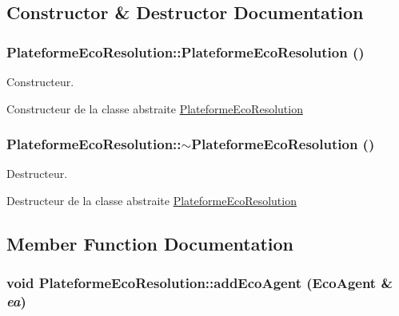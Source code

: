 \subsection{Constructor \& Destructor Documentation}
\hypertarget{classPlateformeEcoResolution_6e03cc2c6a51bc4a47d2d226e41d13e9}{
\subsubsection[{PlateformeEcoResolution}]{\setlength{\rightskip}{0pt plus 5cm}PlateformeEcoResolution::PlateformeEcoResolution ()}}
\label{classPlateformeEcoResolution_6e03cc2c6a51bc4a47d2d226e41d13e9}


Constructeur. 

Constructeur de la classe abstraite \hyperlink{classPlateformeEcoResolution}{PlateformeEcoResolution} \hypertarget{classPlateformeEcoResolution_356b4862f53c4be870304e5186601b5a}{
\subsubsection[{$\sim$PlateformeEcoResolution}]{\setlength{\rightskip}{0pt plus 5cm}PlateformeEcoResolution::$\sim$PlateformeEcoResolution ()}}
\label{classPlateformeEcoResolution_356b4862f53c4be870304e5186601b5a}


Destructeur. 

Destructeur de la classe abstraite \hyperlink{classPlateformeEcoResolution}{PlateformeEcoResolution} 

\subsection{Member Function Documentation}
\hypertarget{classPlateformeEcoResolution_6fdb4c8ecc62252da4326d9763d4f28d}{
\subsubsection[{addEcoAgent}]{\setlength{\rightskip}{0pt plus 5cm}void PlateformeEcoResolution::addEcoAgent ({\bf EcoAgent} \& {\em ea})}}
\label{classPlateformeEcoResolution_6fdb4c8ecc62252da4326d9763d4f28d}


